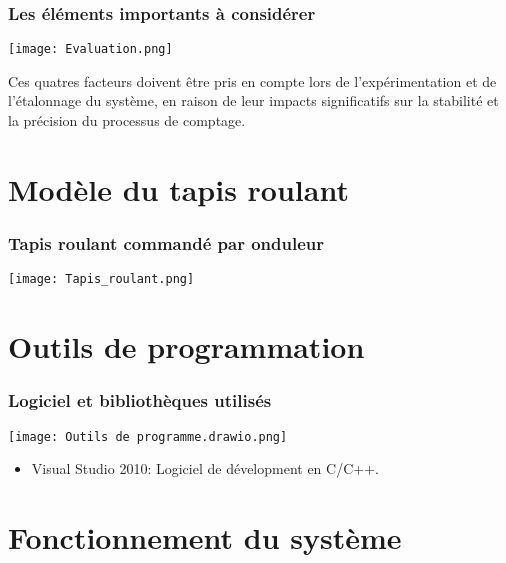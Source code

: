 \documentclass{beamer}
\begin{document}
\begin{frame}
\frametitle{Les éléments importants à considérer}
\centering
    \texttt{[image: Evaluation.png]}

\bigskip
Ces quatres facteurs doivent être pris en compte lors de l'expérimentation et de l'étalonnage du système, en raison de leur impacts significatifs sur la stabilité et la précision du processus de comptage.
\end{frame}

\section{Modèle du tapis roulant}

\begin{frame}
\frametitle{Tapis roulant commandé par onduleur}
\centering
    \texttt{[image: Tapis\_roulant.png]}
\end{frame}

\section{Outils de programmation}

\begin{frame}
\frametitle{Logiciel et bibliothèques utilisés}
\centering
    \texttt{[image: Outils de programme.drawio.png]}  
\bigskip
\begin{itemize}
\item Visual Studio 2010: Logiciel de dévelopment en C/C++.   
\end{itemize} 
\end{frame}

\section{Fonctionnement du système}

\end{document}
